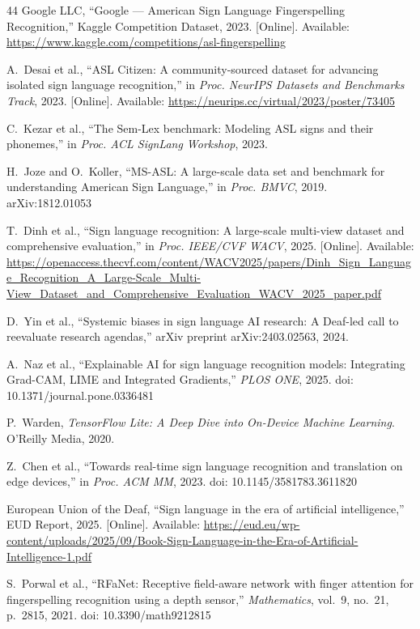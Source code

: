 \documentclass[conference]{IEEEtran}
\begin{document}
\begin{thebibliography}{44}
Google LLC, ``Google --- American Sign Language Fingerspelling Recognition,''
Kaggle Competition Dataset, 2023. [Online]. Available:
\url{https://www.kaggle.com/competitions/asl-fingerspelling}

A.~Desai et al., ``ASL Citizen: A community-sourced dataset for advancing
isolated sign language recognition,'' in \textit{Proc. NeurIPS Datasets and
Benchmarks Track}, 2023. [Online]. Available:
\url{https://neurips.cc/virtual/2023/poster/73405}

C.~Kezar et al., ``The Sem-Lex benchmark: Modeling ASL signs and their
phonemes,'' in \textit{Proc. ACL SignLang Workshop}, 2023.

H.~Joze and O.~Koller, ``MS-ASL: A large-scale data set and benchmark for
understanding American Sign Language,'' in \textit{Proc. BMVC}, 2019.
arXiv:1812.01053

T.~Dinh et al., ``Sign language recognition: A large-scale multi-view dataset
and comprehensive evaluation,'' in \textit{Proc. IEEE/CVF WACV}, 2025.
[Online]. Available:
\url{https://openaccess.thecvf.com/content/WACV2025/papers/Dinh_Sign_Language_Recognition_A_Large-Scale_Multi-View_Dataset_and_Comprehensive_Evaluation_WACV_2025_paper.pdf}

D.~Yin et al., ``Systemic biases in sign language AI research: A Deaf-led call
to reevaluate research agendas,'' arXiv preprint arXiv:2403.02563, 2024.

A.~Naz et al., ``Explainable AI for sign language recognition models:
Integrating Grad-CAM, LIME and Integrated Gradients,'' \textit{PLOS ONE}, 2025.
doi: 10.1371/journal.pone.0336481

P.~Warden, \textit{TensorFlow Lite: A Deep Dive into On-Device Machine
Learning}. O'Reilly Media, 2020.

Z.~Chen et al., ``Towards real-time sign language recognition and translation on
edge devices,'' in \textit{Proc. ACM MM}, 2023.
doi: 10.1145/3581783.3611820

European Union of the Deaf, ``Sign language in the era of artificial
intelligence,'' EUD Report, 2025. [Online]. Available:
\url{https://eud.eu/wp-content/uploads/2025/09/Book-Sign-Language-in-the-Era-of-Artificial-Intelligence-1.pdf}

S.~Porwal et al., ``RFaNet: Receptive field-aware network with finger attention
for fingerspelling recognition using a depth sensor,'' \textit{Mathematics},
vol.~9, no.~21, p.~2815, 2021. doi: 10.3390/math9212815


\end{thebibliography}
\end{document}
